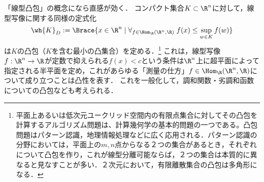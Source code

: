 \documentclass[uplatex, dvipdfmx]{jsreport}
\begin{document}
\begin{remark}
    「線型凸包」の概念になら直感が効く．
    コンパクト集合$K\subset\R^n$に対して，線型写像に関する同様の定式化
    \[\wh{K}_D:=\Brace{x\in\R^n\mid\forall_{f\in\Hom_\R(\R^n,\R)}\;f(x)\le\sup_{w\in K}f(w)}\]
    は$K$の凸包（$K$を含む最小の凸集合）を定める．\footnote{平面上あるいは低次元ユークリッド空間内の有限点集合に対してその凸包を計算するアルゴリズム問題は、計算幾何学の基本的問題の一つである。凸包問題はパターン認識，地理情報処理などに広く応用される．パターン認識の分野においては，平面上の$m,n$点からなる２つの集合があるとき，それぞれについて凸包を作り，これが線型分離可能ならば，２つの集合は本質的に異なると見なすことが多い．２次元において，有限離散集合の凸包は多角形になる．}
    これは，線型写像$f:\R^n\to\R$が定数で抑えられる$f(x)<c$という条件は$\R^n$上に超平面によって指定される半平面を定め，これがあらゆる「測量の仕方」$f\in\Hom_\R(\R^n,\R)$について成り立つことは凸性を表す．
    これを一般化して，調和関数・劣調和函数についての凸包なども考えられる．
\end{remark}
\end{document}
